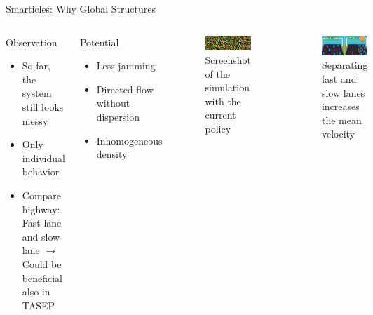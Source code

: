 \documentclass[10pt,xcolor=table, aspectratio=1610]{beamer}
\begin{document}
\begin{frame}{Smarticles: Why Global Structures}
  \begin{columns}
    \begin{block}{Observation}
      \begin{itemize}
        \item So far, the system still looks messy
        \item Only individual behavior
        \item Compare highway: Fast lane and slow lane
        $\rightarrow$ Could be beneficial also in TASEP 
      \end{itemize}
    \end{block}
    \begin{block}{Potential}
      \begin{itemize}
        \item Less jamming
        \item Directed flow without dispersion
        \item Inhomogeneous density
      \end{itemize}
    \end{block}
    \begin{figure}
      \includegraphics[width=\textwidth]{img/messy_tasep.png}
      \caption*{Screenshot of the simulation with the current policy}
    \end{figure}
    \begin{figure}
      \includegraphics[width=\textwidth]{img/fast_lane_slow_lane.png}
      \caption*{Separating fast and slow lanes increases the mean velocity}
    \end{figure}
  \end{columns}
\end{frame}
\end{document}
